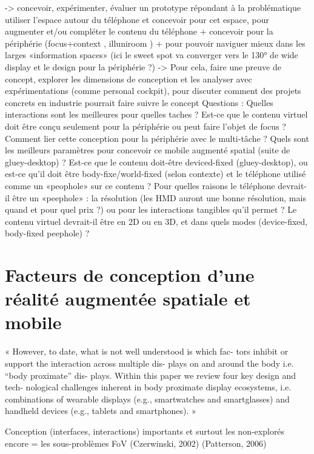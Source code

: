 -> concevoir, expérimenter, évaluer un prototype répondant à la problématique
utiliser l'espace autour du téléphone et concevoir pour cet espace, pour augmenter et/ou compléter le contenu du téléphone 
+ concevoir pour la périphérie (focus+context \cite{CockburnKarlsonBederson2009}, illuniroom \cite{JonesBenkoOfekEtAl2013}) 
+ pour pouvoir naviguer mieux dans les larges «information spaces» \cite{RaedleJetterMuellerEtAl2014} (ici le sweet spot va converger vers le 130° de wide display et le design pour la périphérie ?) -> Pour cela, faire une preuve de concept, explorer les dimensions de conception et les analyser avec expérimentations (comme personal cockpit), pour discuter comment des projets concrets en industrie pourrait faire suivre le concept
Questions : Quelles interactions sont les meilleures pour quelles taches ? Est-ce que le contenu virtuel doit être conçu seulement pour la périphérie ou peut faire l'objet de focus ? Comment lier cette conception pour la périphérie avec le multi-tâche ? Quels sont les meilleurs paramètres pour concevoir ce mobile augmenté spatial (suite de gluey-desktop) ? Est-ce que le contenu doit-être deviced-fixed (gluey-desktop), ou est-ce qu'il doit être body-fixe/world-fixed (selon contexte) et le téléphone utilisé comme un «peophole» sur ce contenu ? Pour quelles raisons le téléphone devrait-il être un «peephole» : la résolution (les HMD auront une bonne résolution, mais quand et pour quel prix ?) ou pour les interactions tangibles qu'il permet ? Le contenu virtuel devrait-il être en 2D ou en 3D, et dans quels modes (device-fixed, body-fixed peephole) ? 

\section*{Facteurs de conception d'une réalité augmentée spatiale et mobile}
« However, to date, what is not well understood is which fac-
tors inhibit or support the interaction across multiple dis-
plays on and around the body i.e. “body proximate” dis-
plays. Within this paper we review four key design and tech-
nological challenges inherent in body proximate display
ecosystems, i.e. combinations of wearable displays (e.g.,
smartwatches and smartglasses) and handheld devices
(e.g., tablets and smartphones). » \cite{GrubertKranzQuigley2015} %

Conception (interfaces, interactions) importants et surtout les non-explorés encore = les sous-problèmes
        FoV (Czerwinski, 2002) (Patterson, 2006) \cite{KishishitaKiyokawaOrloskyEtAl2014} 

